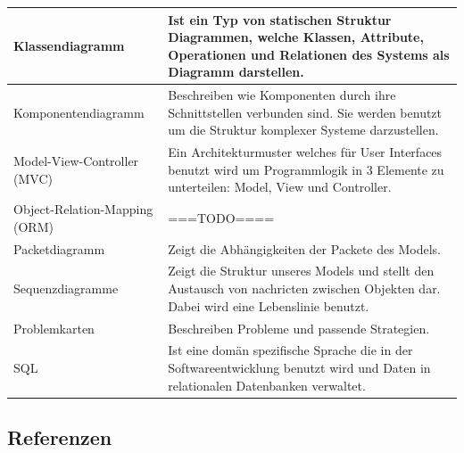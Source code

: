 \documentclass[enabledeprecatedfontcommands,fontsize=12pt,paper=a4,twoside]{scrartcl}
\begin{document}
\begin{longtable}[c]{|p{7cm}|p{8cm}|}
Klassendiagramm                        & Ist ein Typ von statischen Struktur Diagrammen, welche Klassen, Attribute, Operationen und Relationen des Systems als Diagramm darstellen.                                                                              \\ \hline
Komponentendiagramm                    & Beschreiben wie Komponenten durch ihre Schnittstellen verbunden sind. Sie werden benutzt um die Struktur komplexer Systeme darzustellen.                                                                                \\ \hline
Model-View-Controller (MVC)            & Ein Architekturmuster welches für User Interfaces benutzt wird um Programmlogik in 3 Elemente zu unterteilen: Model, View und Controller.                                                                               \\ \hline
Object-Relation-Mapping (ORM)          & ===TODO====                                                                                                                                                                                                             \\ \hline
Packetdiagramm                         & Zeigt die Abhängigkeiten der Packete des Models.                                                                                                                                                                        \\ \hline
Sequenzdiagramme                       & Zeigt die Struktur unseres Models und stellt den Austausch von nachricten zwischen Objekten dar. Dabei wird eine Lebenslinie benutzt.                                                                                   \\ \hline
Problemkarten                          & Beschreiben Probleme und passende Strategien.                                                                                                                                                                           \\ \hline
SQL                                    & Ist eine domän spezifische Sprache die in der Softwareentwicklung benutzt wird und Daten in relationalen Datenbanken verwaltet.                                                                                         \\ \hline
\end{longtable}
\subsection{Referenzen}
\end{document}
